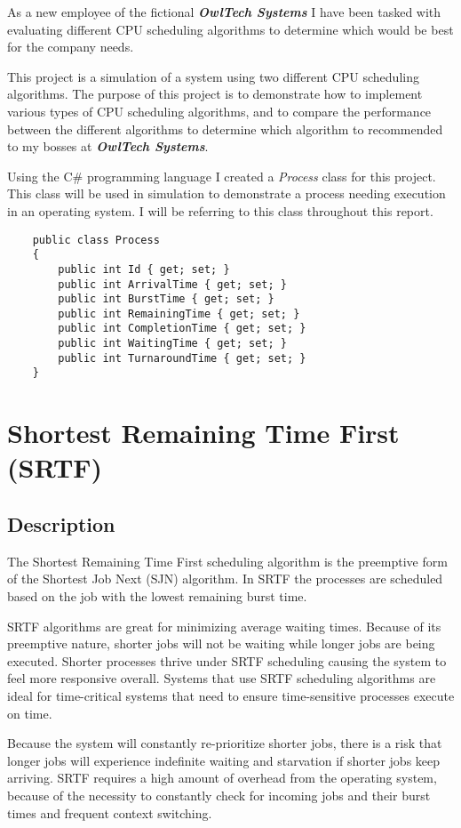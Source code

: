 \documentclass[11pt]{article}
\begin{document}
As a new employee of the fictional \textbf{\textit{OwlTech Systems}} I have been tasked with evaluating different CPU scheduling algorithms to determine which would be best for the company needs.

This project is a simulation of a system using two different CPU scheduling algorithms. The purpose of this project is to demonstrate how to implement various types of CPU scheduling algorithms, and to compare the performance between the different algorithms to determine which algorithm to recommended to my bosses at \textbf{\textit{OwlTech Systems}}.

Using the C\# programming language I created a \textit{Process} class for this project. This class will be used in simulation to demonstrate a process needing execution in an operating system. I will be referring to this class throughout this report.

\begin{verbatim}
    public class Process
    {
        public int Id { get; set; }
        public int ArrivalTime { get; set; }
        public int BurstTime { get; set; }
        public int RemainingTime { get; set; }
        public int CompletionTime { get; set; }
        public int WaitingTime { get; set; }
        public int TurnaroundTime { get; set; }
    }

\end{verbatim}
\section{Shortest Remaining Time First (SRTF)}
\subsection{Description}

The Shortest Remaining Time First scheduling algorithm is the preemptive form of the Shortest Job Next (SJN) algorithm. In SRTF the processes are scheduled based on the job with the lowest remaining burst time.

SRTF algorithms are great for minimizing average waiting times. Because of its preemptive nature, shorter jobs will not be waiting while longer jobs are being executed. Shorter processes thrive under SRTF scheduling causing the system to feel more responsive overall. Systems that use SRTF scheduling algorithms are ideal for time-critical systems that need to ensure time-sensitive processes execute on time.

Because the system will constantly re-prioritize shorter jobs, there is a risk that longer jobs will experience indefinite waiting and starvation if shorter jobs keep arriving. SRTF requires a high amount of overhead from the operating system, because of the necessity to constantly check for incoming jobs and their burst times and frequent context switching.
\end{document}
